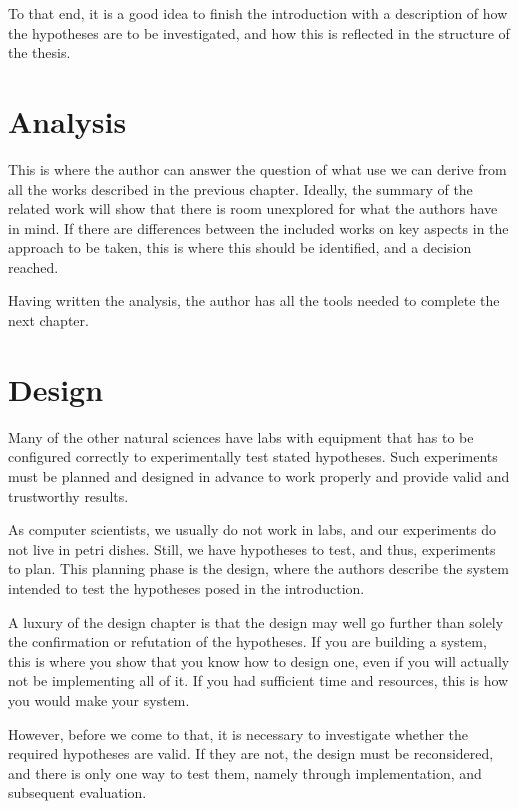 \documentclass[ twoside,openright,titlepage,numbers=noenddot,headinclude,%
                footinclude=true,cleardoublepage=empty,abstractoff, %
                BCOR=5mm,paper=a4,fontsize=11pt,%
                ngerman,american,%
                ]{scrreprt}
\begin{document}
To that end, it is a good idea to finish the introduction with a
description of how the hypotheses are to be investigated, and how this
is reflected in the structure of the thesis.




\chapter{Analysis}
\label{cha:analysis}

This is where the author can answer the question of what use we can
derive from all the works described in the previous chapter. Ideally,
the summary of the related work will show that there is room
unexplored for what the authors have in mind. If there are differences
between the included works on key aspects in the approach to be taken,
this is where this should be identified, and a decision reached.

Having written the analysis, the author has all the tools needed to
complete the next chapter.


\chapter{Design}
\label{cha:design}

Many of the other natural sciences have labs with equipment that has
to be configured correctly to experimentally test stated hypotheses.
Such experiments must be planned and designed in advance to work
properly and provide valid and trustworthy results.

As computer scientists, we usually do not work in labs, and our
experiments do not live in petri dishes. Still, we have hypotheses to
test, and thus, experiments to plan. This planning phase is the
design, where the authors describe the system intended to test the
hypotheses posed in the introduction.

A luxury of the design chapter is that the design may well go further
than solely the confirmation or refutation of the hypotheses.  If you
are building a system, this is where you show that you know how to
design one, even if you will actually not be implementing all of it.
If you had sufficient time and resources, this is how you would make
your system.

However, before we come to that, it is necessary to investigate
whether the required hypotheses are valid. If they are not, the design
must be reconsidered, and there is only one way to test them, namely
through implementation, and subsequent evaluation.
\end{document}
